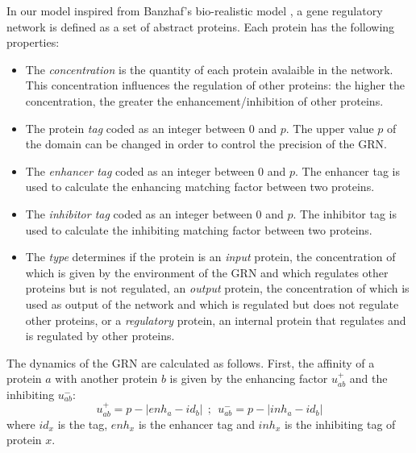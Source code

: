 In our model inspired from Banzhaf's bio-realistic model \cite{Banzhaf03}, a
gene regulatory network is defined as a set of abstract proteins. Each protein has the
following properties:
\begin{itemize}
\item The \emph{concentration} is the quantity of each protein avalaible in the network. This concentration influences the regulation of other proteins: the higher the concentration, the greater the enhancement/inhibition of other proteins.

\item The protein \emph{tag} coded as an integer between 0 and $p$. The
	upper value $p$ of the domain can be changed in order to control the
	precision of the GRN. 

\item The \emph{enhancer tag} coded as an integer between 0 and $p$. The
	enhancer tag is used to calculate the enhancing matching factor
	between two proteins.

\item The \emph{inhibitor tag} coded as an integer between 0 and $p$. The
	inhibitor tag is used to calculate the inhibiting matching factor
	between two proteins.

\item The \emph{type} determines if the protein is an \emph{input} protein, the
	concentration of which is given by the environment of the GRN and which
	regulates other proteins but is not regulated, an \emph{output} protein,
	the concentration of which is used as output of the network and which is
	regulated but does not regulate other proteins, or a \emph{regulatory}
	protein, an internal protein that regulates and is regulated by other
	proteins.

\end{itemize}

The dynamics of the GRN are calculated as follows. First, the affinity of a
protein $a$ with another protein $b$ is given by the enhancing factor
$u^{+}_{ab}$ and the inhibiting $u^{-}_{ab}$:
\begin{equation}
u^{+}_{ab}=p-|enh_a-id_b|~~;~~u^{-}_{ab}=p-|inh_a-id_b|
\end{equation}
where $id_x$ is the tag, $enh_x$ is the enhancer tag and $inh_x$
is the inhibiting tag of protein $x$.

